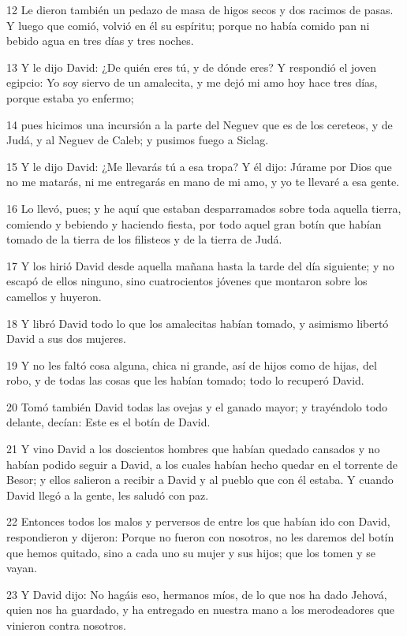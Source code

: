 \par 12 Le dieron también un pedazo de masa de higos secos y dos racimos de pasas. Y luego que comió, volvió en él su espíritu; porque no había comido pan ni bebido agua en tres días y tres noches.
\par 13 Y le dijo David: ¿De quién eres tú, y de dónde eres? Y respondió el joven egipcio: Yo soy siervo de un amalecita, y me dejó mi amo hoy hace tres días, porque estaba yo enfermo;
\par 14 pues hicimos una incursión a la parte del Neguev que es de los cereteos, y de Judá, y al Neguev de Caleb; y pusimos fuego a Siclag.
\par 15 Y le dijo David: ¿Me llevarás tú a esa tropa? Y él dijo: Júrame por Dios que no me matarás, ni me entregarás en mano de mi amo, y yo te llevaré a esa gente.
\par 16 Lo llevó, pues; y he aquí que estaban desparramados sobre toda aquella tierra, comiendo y bebiendo y haciendo fiesta, por todo aquel gran botín que habían tomado de la tierra de los filisteos y de la tierra de Judá.
\par 17 Y los hirió David desde aquella mañana hasta la tarde del día siguiente; y no escapó de ellos ninguno, sino cuatrocientos jóvenes que montaron sobre los camellos y huyeron.
\par 18 Y libró David todo lo que los amalecitas habían tomado, y asimismo libertó David a sus dos mujeres.
\par 19 Y no les faltó cosa alguna, chica ni grande, así de hijos como de hijas, del robo, y de todas las cosas que les habían tomado; todo lo recuperó David.
\par 20 Tomó también David todas las ovejas y el ganado mayor; y trayéndolo todo delante, decían: Este es el botín de David.
\par 21 Y vino David a los doscientos hombres que habían quedado cansados y no habían podido seguir a David, a los cuales habían hecho quedar en el torrente de Besor; y ellos salieron a recibir a David y al pueblo que con él estaba. Y cuando David llegó a la gente, les saludó con paz.
\par 22 Entonces todos los malos y perversos de entre los que habían ido con David, respondieron y dijeron: Porque no fueron con nosotros, no les daremos del botín que hemos quitado, sino a cada uno su mujer y sus hijos; que los tomen y se vayan.
\par 23 Y David dijo: No hagáis eso, hermanos míos, de lo que nos ha dado Jehová, quien nos ha guardado, y ha entregado en nuestra mano a los merodeadores que vinieron contra nosotros.
